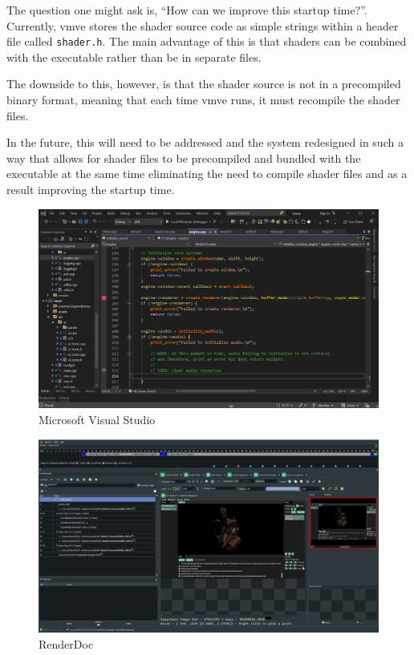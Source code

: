 \documentclass[11pt]{article}
\begin{document}
The question one might ask is, ``How can we improve this startup time?''.
Currently, \gls*{vmve} stores the shader source code as simple strings within a
header file called \lstinline{shader.h}. The main advantage of this is that
shaders can be combined with the executable rather than be in separate files.

The downside to this, however, is that the shader source is not in a precompiled
binary format, meaning that each time \gls*{vmve} runs, it must recompile the
shader files. 

In the future, this will need to be addressed and the system redesigned in such
a way that allows for shader files to be precompiled and bundled with the
executable at the same time eliminating the need to compile shader files and as
a result improving the startup time.


\begin{figure}[H]
  \centering
  \includegraphics[width=\textwidth]{images/visual_studio.png}
  \caption{Microsoft Visual Studio}
  \label{fig:visual_studio}
\end{figure}

\begin{figure}[H]
  \centering
  \includegraphics[width=\textwidth]{images/renderdoc.png}
  \caption{RenderDoc}
  \label{fig:renderdoc}
\end{figure}
\end{document}
